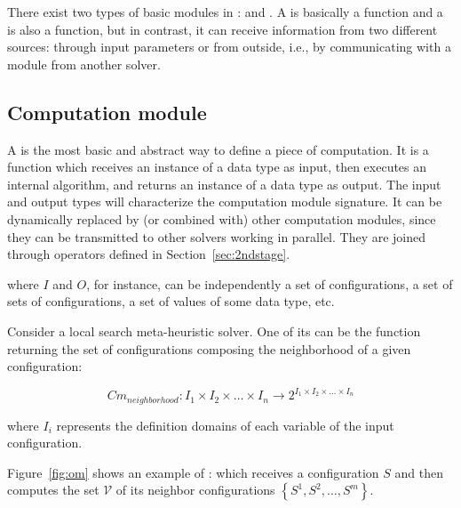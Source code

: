There exist two types of basic modules in \posl: \INTROom{} and \INTROopch{}. A \om{} is basically a function and a \opch{} is also a function, but in contrast, it can receive information from two different sources: through input parameters or from outside, i.e., by communicating with a module from another solver.

\subsection{Computation module}


A \om{} is the most basic and abstract way to define a piece of computation. It is a function which receives an instance of a \posl{} data type as input, then executes an internal algorithm, and returns an instance of a \posl{} data type as output. The input and output types will characterize the computation module signature. It can be dy\-na\-mi\-cally replaced by (or combined with) other computation modules, since they can be transmitted to other solvers working in parallel. They are joined through operators defined in Section~\ref{sec:2ndstage}.


where $I$ and $O$, for instance, can be independently a set of configurations, a set of sets of configurations, a set of values of some data type, etc.

Consider a local search meta-heuristic solver. One of its \oms{} can be the function returning the set of configurations composing the neighborhood of a given configuration:

\begin{equation*}
Cm_{neighborhood}:I_1\times I_2\times\dots\times I_n \rightarrow 2^{I_1\times I_2\times\dots\times I_n}
\end{equation*}

\noindent where $I_i$ represents the definition domains of each variable of the input confi\-gura\-tion.

Figure~\ref{fig:om} shows an example of \om: which receives a configuration $S$ and then computes the set $\mathcal{V}$ of its neighbor configurations $\left\{S^1, S^2, \dots, S^m\right\}$.

